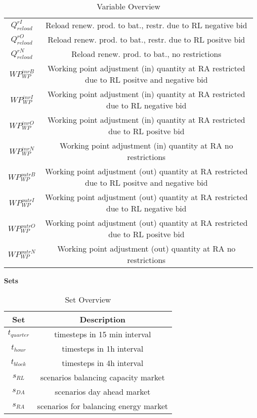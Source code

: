 \begin{table}[H]
\begin{tabular}{c|c}
		$Q^{rI}_{reload}$ & Reload renew. prod. to bat., restr. due to RL negative bid                                  \\
		$Q^{rO}_{reload}$ & Reload renew. prod. to bat., restr. due to RL positve bid                                   \\
		$Q^{rN}_{reload}$ & Reload renew. prod. to bat., no restrictions                                                \\
		$WP^{inrB}_{WP}$  & Working point adjustment (in) quantity at RA restricted due to RL positve and negative bid  \\
		$WP^{inrI}_{WP}$  & Working point adjustment (in) quantity at RA restricted due to RL negative bid              \\
		$WP^{inrO}_{WP}$  & Working point adjustment (in) quantity at RA restricted due to RL positve bid               \\
		$WP^{inrN}_{WP}$  & Working point adjustment (in) quantity at RA no restrictions                                \\
		$WP^{outrB}_{WP}$ & Working point adjustment (out) quantity at RA restricted due to RL positve and negative bid \\
		$WP^{outrI}_{WP}$ & Working point adjustment (out) quantity at RA restricted due to RL negative bid             \\
		$WP^{outrO}_{WP}$ & Working point adjustment (out) quantity at RA restricted due to RL positve bid              \\
		$WP^{outrN}_{WP}$ & Working point adjustment (out) quantity at RA no restrictions                               \\
	\end{tabular}
	\caption{Variable Overview}
	\label{tab:Variable_Overview}
\end{table}

\textbf{Sets}
\begin{table}[H]
	\centering
	\begin{tabular}{c|c}
		\textbf{Set}  & \textbf{Description}                  \\
		\hline
		$t_{quarter}$ & timesteps in 15 min interval          \\
		$t_{hour}$    & timesteps in 1h interval              \\
		$t_{block}$   & timesteps in 4h interval              \\
		$s_{RL}$      & scenarios balancing capacity market   \\
		$s_{DA}$      & scenarios day ahead market            \\
		$s_{RA}$      & scenarios for balancing energy market \\
	\end{tabular}
	\caption{Set Overview}
	\label{tab:Set_Overview}
\end{table}

